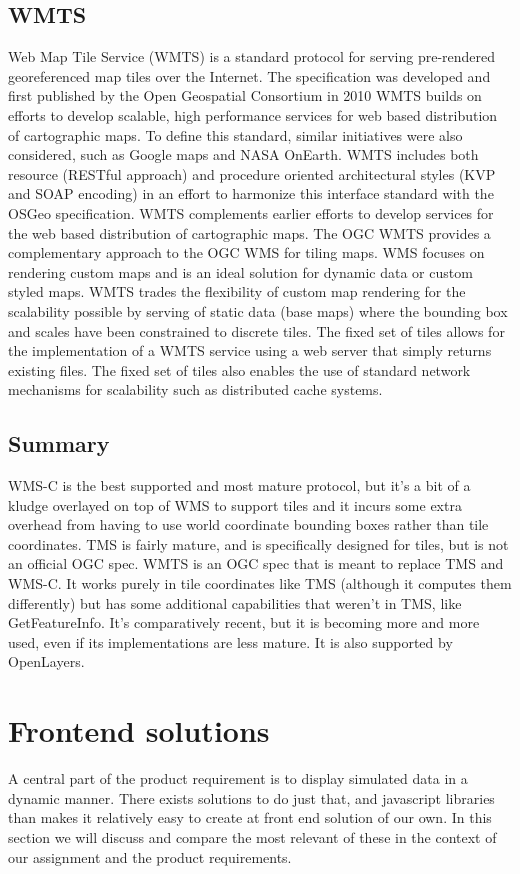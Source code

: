 \documentclass[11pt,a4paper,titlepage,oneside]{report}
\begin{document}
  \subsection{WMTS}
    Web Map Tile Service (WMTS) is a standard protocol for serving pre-rendered georeferenced map tiles over the Internet. The specification was developed and first published by the Open Geospatial Consortium in 2010
    WMTS builds on efforts to develop scalable, high performance services for web based distribution of cartographic maps. To define this standard, similar initiatives were also considered, such as Google maps and NASA OnEarth. WMTS includes both resource (RESTful approach) and procedure oriented architectural styles (KVP and SOAP encoding) in an effort to harmonize this interface standard with the OSGeo specification.
    WMTS complements earlier efforts to develop services for the web based distribution of cartographic maps. The \gls{OGC} WMTS provides a complementary approach to the \gls{OGC} \gls{WMS} for tiling maps. \gls{WMS} focuses on rendering custom maps and is an ideal solution for dynamic data or custom styled maps. WMTS trades the flexibility of custom map rendering for the scalability possible by serving of static data (base maps) where the bounding box and scales have been constrained to discrete tiles. The fixed set of tiles allows for the implementation of a WMTS service using a web server that simply returns existing files. The fixed set of tiles also enables the use of standard network mechanisms for scalability such as distributed cache systems.

  \subsection{Summary}
    WMS-C is the best supported and most mature protocol, but it's a bit of a kludge overlayed on top of \gls{WMS} to support tiles and it incurs some extra overhead from having to use world coordinate bounding boxes rather than tile coordinates.
    TMS is fairly mature, and is specifically designed for tiles, but is not an official \gls{OGC} spec.
    WMTS is an \gls{OGC} spec that is meant to replace TMS and WMS-C. It works purely in tile coordinates like TMS (although it computes them differently) but has some additional capabilities that weren't in TMS, like GetFeatureInfo. It's comparatively recent, but it is becoming more and more used, even if its implementations are less mature. It is also supported by OpenLayers.

\section{Frontend solutions}
  A central part of the product requirement is to display simulated data in a dynamic manner. There exists solutions to do just that, and javascript libraries than makes it relatively easy to create at front end solution of our own. In this section we will discuss and compare the most relevant of these in the context of our assignment and the product requirements. 
\end{document}

